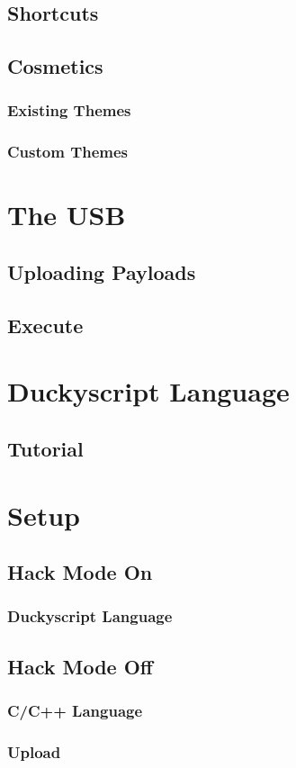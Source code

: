\documentclass[a4paper,12pt]{article}
\begin{document}
\subsection{Shortcuts}

\subsection{Cosmetics}

\subsubsection{Existing Themes}

\subsubsection{Custom Themes}

\section{The USB}

\subsection{Uploading Payloads}

\subsection{Execute}

\subsection{}

\section{Duckyscript Language}

\subsection{Tutorial}

\section{Setup}

\subsection{Hack Mode On}

\subsubsection{Duckyscript Language}

\subsection{Hack Mode Off}

\subsubsection{C/C++ Language}

\subsubsection{Upload}


\newpage
\end{document}

